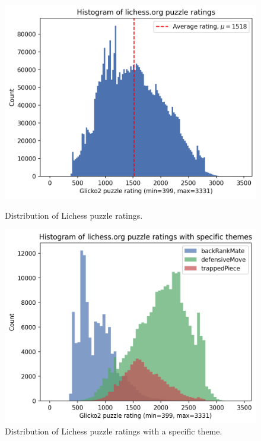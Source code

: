 \begin{figure}[H]
  \begin{minipage}[t]{0.475\textwidth}
    \centering
    \includegraphics[width=\textwidth]{project/img/puzzle_histogram.png}
    \caption{Distribution of Lichess puzzle ratings.}
    \label{dataHistogram}
  \end{minipage}
  \hspace{0.05\textwidth}
  \begin{minipage}[t]{0.475\textwidth}
    \centering
    \includegraphics[width=\textwidth]
    {project/img/puzzle_theme_histograms.png}
    \caption{Distribution of Lichess puzzle ratings with a specific theme.}
    \label{dataThemeHistogram}
  \end{minipage}
\end{figure}

